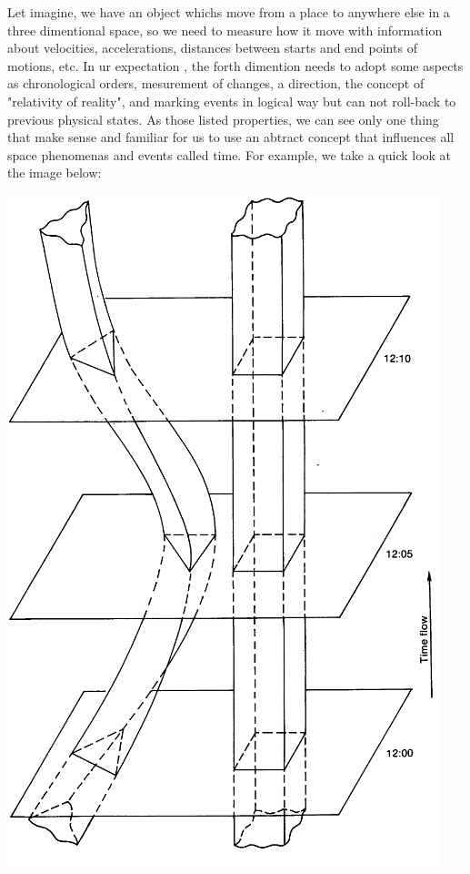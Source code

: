 \documentclass[11pt,a4paper]{article}
\begin{document}
	Let imagine, we have an object whichs move from a place to anywhere else in a three dimentional space, so we need to measure how it move with information about velocities, accelerations, distances between starts and end points of motions, etc. In ur expectation , the forth dimention needs to adopt some aspects as chronological orders, mesurement of  changes, a direction, the concept of "relativity of reality", and  marking events in logical way but can not roll-back to previous physical states.  As those listed properties, we can see only one thing that make sense and familiar for us to use an abtract concept that influences all space phenomenas and events called time. For example, we take a quick look at the image below:
	\begin{center}
		\includegraphics[angle=-90,scale=0.4]{./time_model1.png}		
	\end{center}
\end{document}

